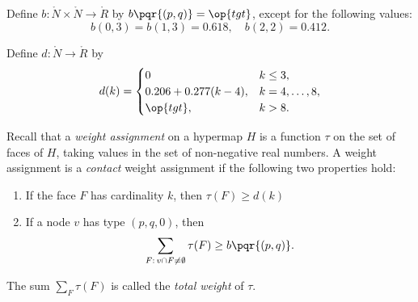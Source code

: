 \begin{definition}[b]
  Define $b:\ring{N}\times \ring{N}\to \ring{R}$ by
  $b\pqr{(p,q)}=\op{tgt}$, except for the following values:
\begin{displaymath}
b(0,3)=b(1,3)=0.618,\quad b(2,2)=0.412.
\end{displaymath}
\end{definition}
%

\begin{definition}[d]
Define $d:\ring{N}\to \ring{R}$ by
\begin{displaymath}d(k) = \begin{cases}
0 & k\le 3, \\
0.206 + 0.277 (k-4),& k=4,\ldots,8,\\
\op{tgt},& k>8.\\
\end{cases}
\end{displaymath}
\end{definition}
%

\begin{definition}
%
Recall that  a {\it weight assignment\/} on a hypermap $H$ is a function $\tau$
  on the set of faces of $H$, taking values in the set of non-negative
  real numbers. A weight assignment is a {\it contact} weight
  assignment if the following two properties hold:
%
%
%
%
\begin{enumerate}
\item If the face $F$ has cardinality $k$, then
$\tau(F) \ge d(k)$
\item If a node $v$ has type $(p,q,0)$, then
  \begin{displaymath}\sum_{F:\,v\cap F\ne\emptyset} \tau(F) \ge
    b{\pqr{(p,q)}}.\end{displaymath}
\end{enumerate}
The sum $\sum_F \tau(F)$ is called the {\it total weight} of $\tau$.
%
\end{definition}


